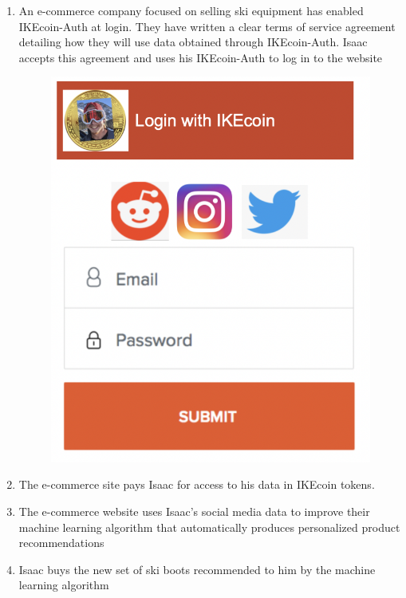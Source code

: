 \documentclass[12pt, letterpaper, twoside]{article}
\begin{document}
\begin{enumerate}
\item An e-commerce company focused on selling ski equipment has enabled IKEcoin-Auth at login. They have written a clear terms of service agreement detailing how they will use data obtained through IKEcoin-Auth. Isaac accepts this agreement and uses his IKEcoin-Auth to log in to the website 
\begin{figure}[h]
\includegraphics[scale=0.3]{media/IKEcoinLogin.jpg}
\centering
\end{figure}
    
\item The e-commerce site pays Isaac for access to his data  in IKEcoin tokens.
    
\item The e-commerce website uses Isaac's social media data to improve their machine learning algorithm that automatically produces personalized product recommendations 
    
\item Isaac buys the new set of ski boots recommended to him by the machine learning algorithm    
\end{enumerate}
\end{document}
